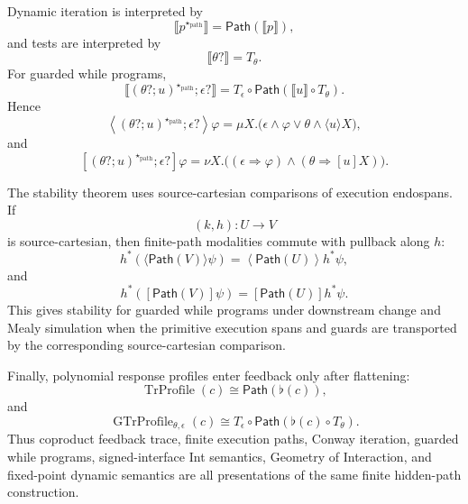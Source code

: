 Dynamic iteration is interpreted by
\[
  \llbracket p^{\star_{\mathrm{path}}}\rrbracket
  =
  \mathsf{Path}(\llbracket p\rrbracket),
\]
and tests are interpreted by
\[
  \llbracket\theta?\rrbracket=T_\theta.
\]
For guarded while programs,
\[
  \llbracket
    (\theta?;u)^{\star_{\mathrm{path}}};\epsilon?
  \rrbracket
  =
  T_\epsilon\circ
  \mathsf{Path}(\llbracket u\rrbracket\circ T_\theta).
\]
Hence
\[
  \left\langle
    (\theta?;u)^{\star_{\mathrm{path}}};\epsilon?
  \right\rangle\varphi
  =
  \mu X.
  \bigl(
    \epsilon\wedge\varphi
    \vee
    \theta\wedge\langle u\rangle X
  \bigr),
\]
and
\[
  \left[
    (\theta?;u)^{\star_{\mathrm{path}}};\epsilon?
  \right]\varphi
  =
  \nu X.
  \bigl(
    (\epsilon\Rightarrow\varphi)
    \wedge
    (\theta\Rightarrow[u]X)
  \bigr).
\]

The stability theorem uses source-cartesian comparisons of execution
endospans. If
\[
  (k,h):U\to V
\]
is source-cartesian, then finite-path modalities commute with pullback along
\(h\):
\[
  h^\ast
  \left(
    \langle\mathsf{Path}(V)\rangle\psi
  \right)
  =
  \left\langle
    \mathsf{Path}(U)
  \right\rangle
  h^\ast\psi,
\]
and
\[
  h^\ast
  \left(
    [\mathsf{Path}(V)]\psi
  \right)
  =
  \left[
    \mathsf{Path}(U)
  \right]
  h^\ast\psi.
\]
This gives stability for guarded while programs under downstream change and
Mealy simulation when the primitive execution spans and guards are transported
by the corresponding source-cartesian comparison.

Finally, polynomial response profiles enter feedback only after flattening:
\[
  \operatorname{TrProfile}(c)
  \cong
  \mathsf{Path}(\flat(c)),
\]
and
\[
  \operatorname{GTrProfile}_{\theta,\epsilon}(c)
  \cong
  T_\epsilon\circ
  \mathsf{Path}(\flat(c)\circ T_\theta).
\]
Thus coproduct feedback trace, finite execution paths, Conway iteration,
guarded while programs, signed-interface Int semantics, Geometry of
Interaction, and fixed-point dynamic semantics are all presentations of the
same finite hidden-path construction.